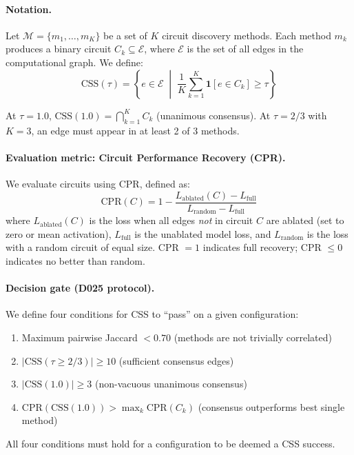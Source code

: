 \documentclass[11pt,a4paper]{article}
\begin{document}
\paragraph{Notation.}
Let $\mathcal{M} = \{m_1, \ldots, m_K\}$ be a set of $K$ circuit discovery methods. Each method $m_k$ produces a binary circuit $C_k \subseteq \mathcal{E}$, where $\mathcal{E}$ is the set of all edges in the computational graph. We define:
\begin{equation}
    \text{CSS}(\tau) = \left\{ e \in \mathcal{E} \;\middle|\; \frac{1}{K}\sum_{k=1}^{K} \mathbf{1}[e \in C_k] \geq \tau \right\}
\end{equation}

At $\tau = 1.0$, $\text{CSS}(1.0) = \bigcap_{k=1}^{K} C_k$ (unanimous consensus). At $\tau = 2/3$ with $K=3$, an edge must appear in at least 2 of 3 methods.

\paragraph{Evaluation metric: Circuit Performance Recovery (CPR).}
We evaluate circuits using CPR, defined as:
\begin{equation}
    \text{CPR}(C) = 1 - \frac{L_{\text{ablated}}(C) - L_{\text{full}}}{L_{\text{random}} - L_{\text{full}}}
\end{equation}
where $L_{\text{ablated}}(C)$ is the loss when all edges \emph{not} in circuit $C$ are ablated (set to zero or mean activation), $L_{\text{full}}$ is the unablated model loss, and $L_{\text{random}}$ is the loss with a random circuit of equal size. CPR $= 1$ indicates full recovery; CPR $\leq 0$ indicates no better than random.

\paragraph{Decision gate (D025 protocol).}
We define four conditions for CSS to ``pass'' on a given configuration:
\begin{enumerate}
    \item[C1:] Maximum pairwise Jaccard $< 0.70$ (methods are not trivially correlated)
    \item[C2:] $|\text{CSS}(\tau{\geq}2/3)| \geq 10$ (sufficient consensus edges)
    \item[C3:] $|\text{CSS}(1.0)| \geq 3$ (non-vacuous unanimous consensus)
    \item[C4:] $\text{CPR}(\text{CSS}(1.0)) > \max_k \text{CPR}(C_k)$ (consensus outperforms best single method)
\end{enumerate}
All four conditions must hold for a configuration to be deemed a CSS success.
\end{document}

